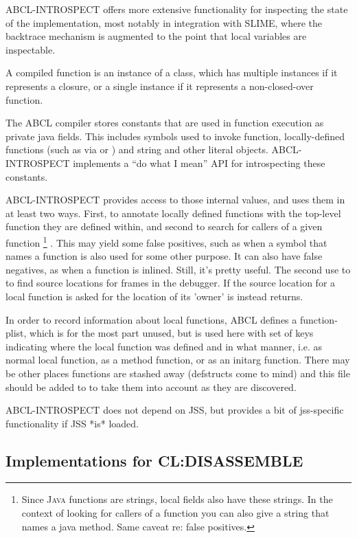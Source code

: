 \documentclass[10pt]{book}
\begin{document}
\textsc{ABCL-INTROSPECT} offers more extensive functionality for
inspecting the state of the implementation, most notably in
integration with \textsc{SLIME}, where the backtrace mechanism is
augmented to the point that local variables are inspectable.

A compiled function is an instance of a class, which has multiple
instances if it represents a closure, or a single instance if it
represents a non-closed-over function.

The \textsc{ABCL} compiler stores constants that are used in function
execution as private java fields. This includes symbols used to invoke
function, locally-defined functions (such as via  or
) and string and other literal objects.
\textsc{ABCL-INTROSPECT} implements a ``do what I mean'' API for
introspecting these constants.

\textsc{ABCL-INTROSPECT} provides access to those internal values, and
uses them in at least two ways. First, to annotate locally defined
functions with the top-level function they are defined within, and
second to search for callers of a given function \footnote{ Since \textsc{Java}
  functions are strings, local fields also have these strings. In the
  context of looking for callers of a function you can also give a
  string that names a java method. Same caveat re: false positives.}
. This may yield some false positives, such as when a symbol that
names a function is also used for some other purpose. It can also have
false negatives, as when a function is inlined. Still, it's pretty
useful. The second use to to find source locations for frames in the
debugger. If the source location for a local function is asked for the
location of its 'owner' is instead returns.

In order to record information about local functions, \textsc{ABCL}
defines a function-plist, which is for the most part unused, but is
used here with set of keys indicating where the local function was
defined and in what manner, i.e. as normal local function, as a method
function, or as an initarg function. There may be other places
functions are stashed away (defstructs come to mind) and this file
should be added to to take them into account as they are discovered.

\textsc{ABCL-INTROSPECT} does not depend on \textsc{JSS}, but provides
  a bit of jss-specific functionality if \textsc{JSS} *is* loaded.

\subsection{Implementations for CL:DISASSEMBLE}
\label{abcl-introspect-disassemblers}
\end{document}
